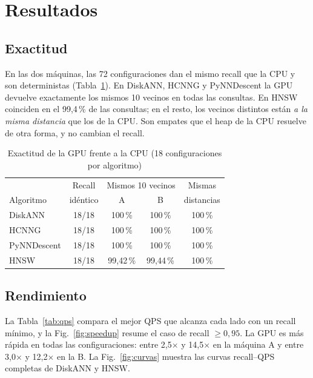 \documentclass[conference,10pt]{IEEEtran}
\newcommand{\x}{$\times$}
\begin{document}
\section{Resultados}

\subsection{Exactitud}

En las dos máquinas, las 72 configuraciones dan el mismo recall que la CPU y son
deterministas (Tabla~\ref{tab:exactitud}). En DiskANN, HCNNG y PyNNDescent la GPU
devuelve exactamente los mismos 10 vecinos en todas las consultas. En HNSW coinciden en
el 99,4\,\% de las consultas; en el resto, los vecinos distintos están \emph{a la misma
distancia} que los de la CPU. Son empates que el heap de la CPU resuelve de otra forma, y
no cambian el recall.

\begin{table}[t]
\centering
\caption{Exactitud de la GPU frente a la CPU (18 configuraciones por algoritmo)}
\label{tab:exactitud}
\begin{tabular}{lcccc}
\toprule
 & Recall & \multicolumn{2}{c}{Mismos 10 vecinos} & Mismas \\
Algoritmo & idéntico & A & B & distancias \\
\midrule
DiskANN & 18/18 & 100\,\% & 100\,\% & 100\,\% \\
HCNNG & 18/18 & 100\,\% & 100\,\% & 100\,\% \\
PyNNDescent & 18/18 & 100\,\% & 100\,\% & 100\,\% \\
HNSW & 18/18 & 99,42\,\% & 99,44\,\% & 100\,\% \\
\bottomrule
\end{tabular}
\end{table}

\subsection{Rendimiento}

La Tabla~\ref{tab:qps} compara el mejor QPS que alcanza cada lado con un recall mínimo, y
la Fig.~\ref{fig:speedup} resume el caso de recall $\geq 0{,}95$. La GPU es más rápida en
todas las configuraciones: entre 2,5\x{} y 14,5\x{} en la máquina A y entre 3,0\x{} y
12,2\x{} en la B. La Fig.~\ref{fig:curvas} muestra las curvas recall--QPS completas de
DiskANN y HNSW.
\end{document}
